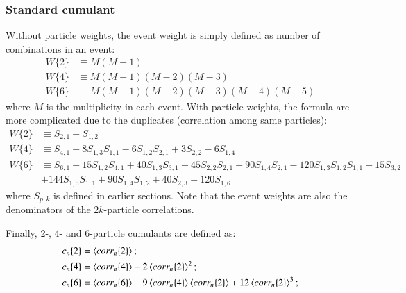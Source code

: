 \subsubsection{Standard cumulant}
Without particle weights, the event weight is simply defined as number of combinations in an event:
\begin{equation}
\begin{split}
W\{2\}&\equiv M(M-1) \\
W\{4\}&\equiv M(M-1)(M-2)(M-3) \\
W\{6\}&\equiv M(M-1)(M-2)(M-3)(M-4)(M-5)
\end{split}
\end{equation}
where $M$ is the multiplicity in each event. With particle weights, the formula are more complicated due to the duplicates (correlation among same particles):
\begin{equation}
\begin{split}
W\{2\}&\equiv S_{2,1}-S_{1,2} \\
W\{4\}&\equiv S_{4,1}+8S_{1,3}S_{1,1}-6S_{1,2}S_{2,1}+3S_{2,2}-6S_{1,4} \\
W\{6\}&\equiv S_{6,1}-15S_{1,2}S_{4,1}+40S_{1,3}S_{3,1}+45S_{2,2}S_{2,1}-90S_{1,4}S_{2,1}-120S_{1,3}S_{1,2}S_{1,1}-15S_{3,2} \\
&+144S_{1,5}S_{1,1}+90S_{1,4}S_{1,2}+40S_{2,3}-120S_{1,6}
\end{split}
\end{equation}
where $S_{p,k}$ is defined in earlier sections. Note that the event weights are also the denominators of the $2k$-particle correlations.

Finally, 2-, 4- and 6-particle cumulants are defined as:
\begin{equation}
\begin{split}
c_n\{2\}&= \left\langle corr_n\{2\}\right\rangle; \\
c_n\{4\}&= \left\langle corr_n\{4\}\right\rangle-2\left\langle corr_n\{2\}\right\rangle^2; \\
c_n\{6\}&= \left\langle corr_n\{6\}\right\rangle-9\left\langle corr_n\{4\}\right\rangle\left\langle corr_n\{2\}\right\rangle+12\left\langle corr_n\{2\}\right\rangle^3;
\end{split}
\end{equation}


